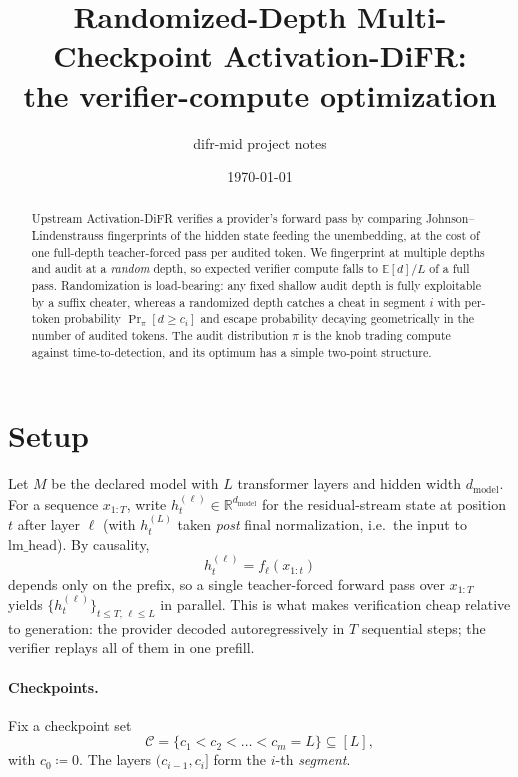 \documentclass[11pt]{article}
\title{Randomized-Depth Multi-Checkpoint Activation-DiFR:\\ the verifier-compute optimization}
\author{difr-mid project notes}
\date{\today}
\begin{document}
\maketitle

\begin{abstract}
Upstream Activation-DiFR verifies a provider's forward pass by comparing
Johnson--Lindenstrauss fingerprints of the hidden state feeding the unembedding,
at the cost of one full-depth teacher-forced pass per audited token. We fingerprint
at multiple depths and audit at a \emph{random} depth, so expected verifier compute
falls to $\mathbb{E}[d]/L$ of a full pass. Randomization is load-bearing: any fixed
shallow audit depth is fully exploitable by a suffix cheater, whereas a randomized
depth catches a cheat in segment $i$ with per-token probability $\Pr_\pi[d\ge c_i]$
and escape probability decaying geometrically in the number of audited tokens. The
audit distribution $\pi$ is the knob trading compute against time-to-detection, and
its optimum has a simple two-point structure.
\end{abstract}

\section{Setup}

Let $M$ be the declared model with $L$ transformer layers and hidden width $d_{\mathrm{model}}$.
For a sequence $x_{1:T}$, write $h^{(\ell)}_t \in \mathbb{R}^{d_{\mathrm{model}}}$ for the residual-stream
state at position $t$ after layer $\ell$ (with $h^{(L)}_t$ taken \emph{post} final
normalization, i.e.\ the input to $\mathrm{lm\_head}$). By causality,
\[
  h^{(\ell)}_t = f_\ell\!\left(x_{1:t}\right)
\]
depends only on the prefix, so a single teacher-forced forward pass over $x_{1:T}$ yields
$\{h^{(\ell)}_t\}_{t\le T,\,\ell\le L}$ in parallel. This is what makes verification cheap
relative to generation: the provider decoded autoregressively in $T$ sequential steps; the
verifier replays all of them in one prefill.

\paragraph{Checkpoints.}
Fix a checkpoint set
\[
  \mathcal{C} = \{c_1 < c_2 < \dots < c_m = L\} \subseteq [L],
\]
with $c_0 \coloneqq 0$. The layers $(c_{i-1}, c_i]$ form the $i$-th \emph{segment}.
\end{document}
